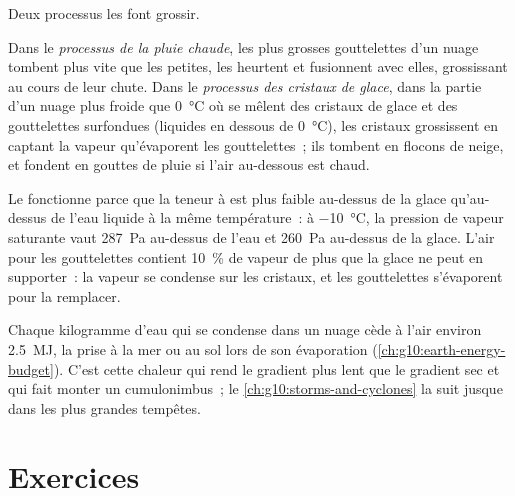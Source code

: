 Deux processus les font grossir.

\begin{definition}\label{def:g10:why-clouds-form:rain-processes}
Dans le \emph{processus de la pluie chaude},
les plus grosses gouttelettes d'un nuage tombent plus vite que les petites,
les heurtent et fusionnent avec elles, grossissant au cours de leur chute.
Dans le \emph{processus des cristaux de
glace}, dans la partie d'un nuage
plus froide que \qty{0}{\degreeCelsius} où se mêlent des cristaux de glace
et des gouttelettes surfondues (liquides en dessous de
\qty{0}{\degreeCelsius}), les cristaux grossissent en captant la vapeur
qu'évaporent les gouttelettes~; ils tombent en flocons de neige, et fondent
en gouttes de pluie si l'air au-dessous est chaud.
\end{definition}

Le  fonctionne parce que la teneur à
 est plus faible au-dessus de la glace qu'au-dessus de l'eau
liquide à la même température~: à \qty{-10}{\degreeCelsius}, la pression de
vapeur saturante vaut \qty{287}{Pa} au-dessus de l'eau et \qty{260}{Pa}
au-dessus de la glace. L'air  pour les gouttelettes contient
\qty{10}{\percent} de vapeur de plus que la glace ne peut en supporter~: la
vapeur se condense sur les cristaux, et les gouttelettes s'évaporent pour la
remplacer.

\begin{remark}\label{rem:g10:why-clouds-form:latent}
Chaque kilogramme d'eau qui se condense dans un nuage cède à l'air environ
\qty{2.5}{MJ}, la  prise à la mer ou au sol lors de son
évaporation (\cref{ch:g10:earth-energy-budget}). C'est cette chaleur qui
rend le gradient  plus lent que le gradient sec et qui fait monter un
cumulonimbus~; le \cref{ch:g10:storms-and-cyclones} la suit jusque dans les
plus grandes tempêtes.
\end{remark}

\section{Exercices}


